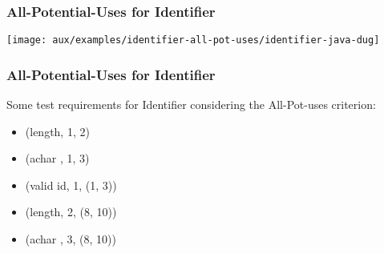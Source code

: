 \begin{frame}[hasprev=false,hasnext=true, c]
\frametitle{All-Potential-Uses for Identifier}
\label{example:identifier-all-pot-uses}

\texttt{[image: aux/examples/identifier-all-pot-uses/identifier-java-dug]}
\end{frame}


\begin{frame}[hasprev=true,hasnext=false]
\frametitle{All-Potential-Uses for Identifier}

Some test requirements for Identifier considering the All-Pot-uses criterion:

\begin{itemize}
	\item (length, 1, 2)
	\item (achar , 1, 3)
	\item (valid id, 1, (1, 3))
	\item (length, 2, (8, 10))
	\item (achar , 3, (8, 10))
\end{itemize}

\end{frame}